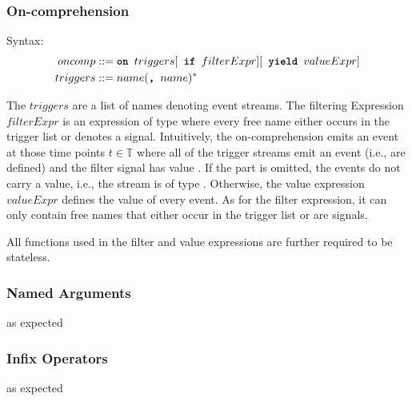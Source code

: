 \subsubsection{On-comprehension}

Syntax:
\begin{align*}
  oncomp   &::= \texttt{\textbf{on }} triggers [\texttt{\textbf{ if }} filterExpr] [\texttt{\textbf{ yield }} valueExpr] \\
  triggers &::= name(\texttt{\textbf{, }} name)^*
\end{align*}

The $triggers$ are a list of names denoting event streams. 
The filtering Expression $filterExpr$ is an expression of type  where every free name either occurs in the trigger list or denotes a signal. 
Intuitively, the on-comprehension emits an event at those time points $t∈𝕋$ where all of the trigger streams emit an event (i.e., are defined) and the filter signal has value .
If the  part is omitted, the events do not carry a value, i.e., the stream is of type . 
Otherwise, the value expression $valueExpr$ defines the value of every event. 
As for the filter expression, it can only contain free names that either occur in the trigger list or are signals.

All functions used in the filter and value expressions are further required to be stateless.

\subsubsection{Named Arguments}

as expected

\subsubsection{Infix Operators}

as expected

